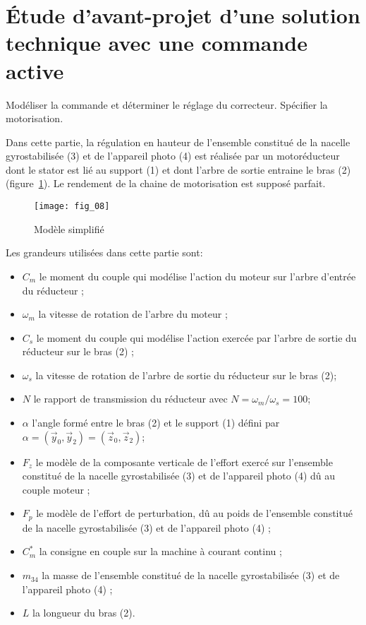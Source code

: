 \section{\label{part:4} Étude d'avant-projet d'une solution technique avec une commande active }


\begin{obj}
Modéliser la commande et déterminer le réglage du correcteur. Spécifier la motorisation.
\end{obj}

Dans cette partie, la régulation en hauteur de l'ensemble constitué de la nacelle gyrostabilisée (3) et de l'appareil photo (4) est réalisée par un motoréducteur dont le stator est lié au support (1) et dont l'arbre de sortie entraine le bras (2) (figure~\ref{fig:08}). Le rendement de la chaine de motorisation est supposé parfait.

\begin{figure}[H]
\centering
\texttt{[image: fig\_08]}
\caption{\label{fig:08} Modèle simplifié}
\end{figure}

 Les grandeurs utilisées dans cette partie sont:

\begin{itemize}
  \item $C_{m}$ le moment du couple qui modélise l'action du moteur sur l'arbre d'entrée du réducteur ;
  \item $\omega_{m}$ la vitesse de rotation de l'arbre du moteur ;
  \item $C_{s}$ le moment du couple qui modélise l'action exercée par l'arbre de sortie du réducteur sur le bras (2) ;
  \item $\omega_{s}$ la vitesse de rotation de l'arbre de sortie du réducteur sur le bras (2);
  \item $N$ le rapport de transmission du réducteur avec $N=\omega_{m} / \omega_{s}=100$;
  \item $\alpha$ l'angle formé entre le bras (2) et le support (1) défini par $\alpha=\left(\vec{y}_{0}, \vec{y}_{2}\right)=\left(\vec{z}_{0}, \vec{z}_{2}\right)$;
  \item $F_{z}$ le modèle de la composante verticale de l'effort exercé sur l'ensemble constitué de la nacelle gyrostabilisée (3) et de l'appareil photo (4) dû au couple moteur ;
  \item $F_{p}$ le modèle de l'effort de perturbation, dû au poids de l'ensemble constitué de la nacelle gyrostabilisée (3) et de l'appareil photo (4) ;
  \item $C_{m}^{*}$ la consigne en couple sur la machine à courant continu ;
  \item $m_{34}$ la masse de l'ensemble constitué de la nacelle gyrostabilisée (3) et de l'appareil photo (4) ;
  \item $L$ la longueur du bras (2).
\end{itemize}

